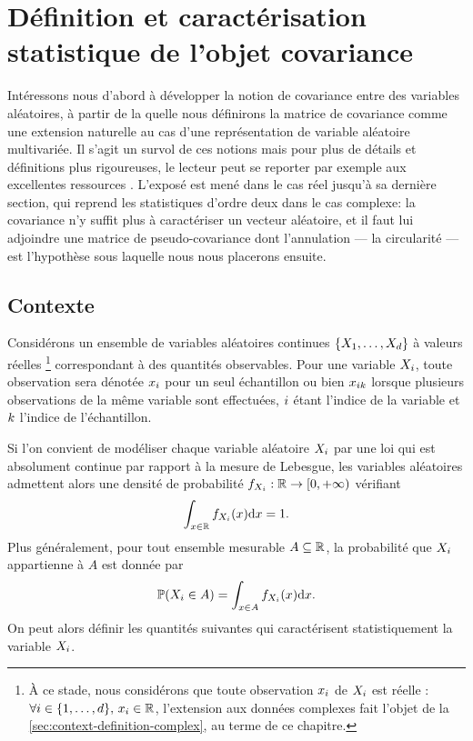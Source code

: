\chapter{Définition et caractérisation statistique de l'objet covariance}
\label{ch:context-definition}

Intéressons nous d'abord à développer la notion de covariance entre des variables aléatoires, à partir de la quelle nous définirons la matrice de covariance comme une extension naturelle au cas d'une représentation de variable aléatoire multivariée. Il s'agit un survol de ces notions mais pour plus de détails et définitions plus rigoureuses, le lecteur peut se reporter par exemple aux excellentes ressources . L'exposé est mené dans le cas réel jusqu'à sa dernière section, qui reprend les statistiques d'ordre deux dans le cas complexe: la covariance n'y suffit plus à caractériser un vecteur aléatoire, et il faut lui adjoindre une matrice de pseudo-covariance dont l'annulation --- la circularité --- est l'hypothèse sous laquelle nous nous placerons ensuite.


\section{Contexte}
\label{sec:context-definition-contexte}



Considérons un ensemble de variables aléatoires continues
$\{ X_1, \dots, X_d \}$ à valeurs réelles
\footnote{
  À ce stade, nous considérons que toute observation $x_i$ de
  $X_i$ est réelle :
  $\forall i\in\{1, \dots, d\},\, x_i \in \mathbb{R}$,
  l'extension aux données complexes fait l'objet de la \cref{sec:context-definition-complex},
  au terme de ce chapitre.
}
correspondant à des quantités observables. Pour une variable
$X_i$, toute observation sera dénotée $x_i$ pour un seul
échantillon ou bien $x_{ik}$ lorsque plusieurs observations de la
même variable sont effectuées, $i$ étant l'indice de la variable et
$k$ l'indice de l'échantillon.


Si l'on convient de modéliser chaque variable aléatoire $X_i$ par une loi qui est
absolument continue par rapport à la mesure de Lebesgue, les variables aléatoires admettent alors
une densité de probabilité
$f_{X_i}:\mathbb{R}\to[0,+\infty)$ vérifiant
\begin{equation*}
  \int_{x\in\mathbb{R}} f_{X_i}(x)\mathrm{d} x = 1.
  \label{eq:context-definition-normalisation-densite}
\end{equation*}
Plus généralement, pour tout ensemble mesurable $A\subseteq\mathbb{R}$,
la probabilité que $X_i$ appartienne à $A$ est donnée par
\begin{equation}
  \operatorname{\mathbb{P}}(X_i\in A)
  =
  \int_{x\in A}f_{X_i}(x)\mathrm{d} x.
  \label{eq:context-definition-probabilite-densite}
\end{equation}
On peut alors définir les quantités suivantes qui caractérisent
statistiquement la variable $X_i$.


